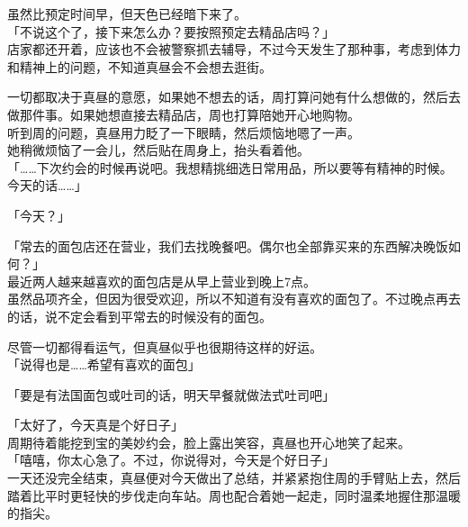 虽然比预定时间早，但天色已经暗下来了。\\

「不说这个了，接下来怎么办？要按照预定去精品店吗？」\\

店家都还开着，应该也不会被警察抓去辅导，不过今天发生了那种事，考虑到体力和精神上的问题，不知道真昼会不会想去逛街。

一切都取决于真昼的意愿，如果她不想去的话，周打算问她有什么想做的，然后去做那件事。如果她想直接去精品店，周也打算陪她开心地购物。\\

听到周的问题，真昼用力眨了一下眼睛，然后烦恼地嗯了一声。\\

她稍微烦恼了一会儿，然后贴在周身上，抬头看着他。\\

「……下次约会的时候再说吧。我想精挑细选日常用品，所以要等有精神的时候。今天的话……」

「今天？」

「常去的面包店还在营业，我们去找晚餐吧。偶尔也全部靠买来的东西解决晚饭如何？」\\

最近两人越来越喜欢的面包店是从早上营业到晚上7点。\\

虽然品项齐全，但因为很受欢迎，所以不知道有没有喜欢的面包了。不过晚点再去的话，说不定会看到平常去的时候没有的面包。

尽管一切都得看运气，但真昼似乎也很期待这样的好运。\\

「说得也是……希望有喜欢的面包」

「要是有法国面包或吐司的话，明天早餐就做法式吐司吧」

「太好了，今天真是个好日子」\\

周期待着能挖到宝的美妙约会，脸上露出笑容，真昼也开心地笑了起来。\\

「嘻嘻，你太心急了。不过，你说得对，今天是个好日子」\\

一天还没完全结束，真昼便对今天做出了总结，并紧紧抱住周的手臂贴上去，然后踏着比平时更轻快的步伐走向车站。周也配合着她一起走，同时温柔地握住那温暖的指尖。\\

